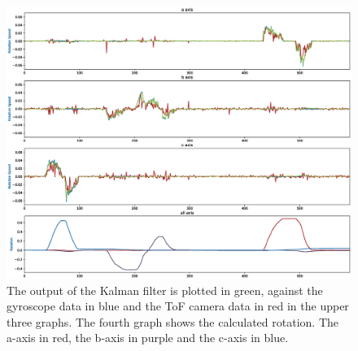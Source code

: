 \begin{figure}[H]
  \centering
  \includegraphics[width=1.0\textwidth]{images/meas_kalman_rotation.eps}
  \caption{The output of the Kalman filter is plotted in green, against the gyroscope data in blue and the ToF camera data in red in the upper three graphs. The fourth graph shows the calculated rotation. The a-axis in red, the b-axis in purple and the c-axis in blue.}
  \label{im:meas_kalman_rotation}
\end{figure} 
